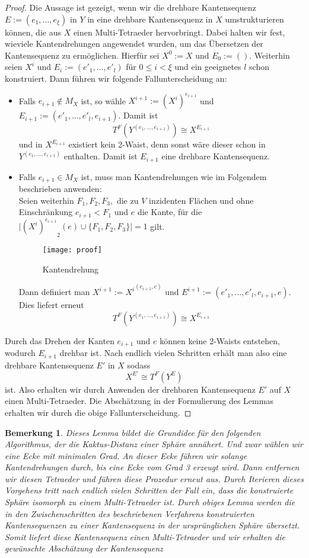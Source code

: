 \documentclass[12pt,titlepage,twoside,cleardoublepage]{article}
\theoremstyle{nummermitklammern}
\newtheorem{bemerkung}[temp]{Bemerkung}
\newtheorem{bemerkung}[zahl]{Bemerkung}
\numberwithin{equation}{section}
\begin{document}
\begin{proof}
Die Aussage ist gezeigt, wenn wir die drehbare Kantensequenz $E:=(e_1,\ldots,e_{\xi})$ in $Y$ in eine drehbare Kantensequenz in $X$ umstrukturieren können, die aus $X$ einen Multi-Tetraeder hervorbringt. Dabei halten wir fest, wieviele Kantendrehungen angewendet wurden, um das Übersetzen der Kantensequenz zu ermöglichen. Hierfür sei $X^0:=X$ und $E_0:=().$ Weiterhin seien $X^i$ und $E_i:=(e'_1,\ldots,e'_l)$ für $0\leq i < \xi$ und ein geeignetes $l$ schon konstruiert. Dann führen wir folgende Fallunterscheidung an:
\begin{itemize}
\item Falls $e_{i+1} \notin M_X $ ist, so wähle $X^{i+1}:={(X^i)}^{e_{i+1}}$ und $E_{i+1}:=(e'_1,\ldots,e'_l,e_{i+1})$. Damit ist 
\[
T^F(Y^{(e_1,\ldots,e_{i+1})})\cong X^{E_{i+1}}
\]
und in $X^{E_{i+1}}$ existiert kein 2-Waist, denn sonst wäre dieser schon in $Y^{(e_1,\ldots,e_{i+1})}$ enthalten. Damit ist $E_{i+1}$ eine drehbare Kantensequenz.
\item Falls $e_{i+1}\in M_X$ ist, muss man Kantendrehungen wie im Folgendem beschrieben anwenden:\\
Seien weiterhin $F_1,F_2,F_3,$ die zu $V$ inzidenten Flächen und ohne Einschränkung $e_{i+1}<F_1$ und $e$ die Kante, für die $\vert {(X^i)^{e_{i+1}}}_2(e)\cup \{F_1,F_2,F_3\}\vert =1$ gilt.
\begin{figure}[H]
\begin{center}
\texttt{[image: proof]}
\end{center}
\caption{Kantendrehung}
\end{figure}
Dann definiert man $X^{i+1}:={X^i}^{(e_{i+1},e)}$ und $E^{i+1}:=(e'_1,\ldots,e'_l,e_{i+1},e).$ Dies liefert erneut
\[
T^F(Y^{(e_1,\ldots,e_{i+1})})\cong X^{E_{i+1}}
\] 
\end{itemize}
 Durch das Drehen der Kanten $e_{i+1}$ und $e$ können keine 2-Waists entstehen, wodurch $E_{i+1}$ drehbar ist.
Nach endlich vielen Schritten erhält man also eine drehbare Kantensequenz $E'$ in $X$ sodass 
\[X^{E'}\cong T^F(Y^E)
\]ist.
Also erhalten wir durch Anwenden der drehbaren Kantensequenz $E'$ auf $X$ einen Multi-Tetraeder. Die Abschätzung in der Formulierung des Lemmas erhalten wir durch die obige Fallunterscheidung.
\end{proof}
\begin{bemerkung}
Dieses Lemma bildet die Grundidee für den folgenden Algorithmus, der die Kaktus-Distanz einer Sphäre annähert. Und zwar wählen wir eine Ecke mit minimalen Grad. An dieser Ecke führen wir solange Kantendrehungen durch, bis eine Ecke vom Grad 3 erzeugt wird. Dann entfernen wir diesen Tetraeder und führen diese Prozedur erneut aus. Durch Iterieren dieses Vorgehens tritt nach endlich vielen Schritten der Fall ein, dass die konstruierte Sphäre isomorph zu einem Multi-Tetraeder ist. Durch obiges Lemma werden die in den Zwischenschritten des beschriebenen Verfahrens konstruierten Kantensequenzen zu einer Kantensequenz in der ursprünglichen Sphäre übersetzt. Somit liefert diese Kantensequenz einen Multi-Tetraeder und wir erhalten die gewünschte Abschätzung der Kantensequenz
\end{bemerkung}
\end{document}

